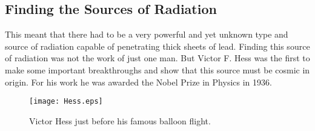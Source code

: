 \subsection{Finding the Sources of Radiation}
This meant that there had to be a very powerful and yet unknown type and source of radiation capable of penetrating thick sheets of lead. Finding this source of radiation was not the work of just one man. But Victor F. Hess was the first to make some important breakthroughs and show that this source must be cosmic in origin. For his work he was awarded the Nobel Prize in Physics in 1936.

\begin{figure}\begin{center}
\texttt{[image: Hess.eps]}
\caption{Victor Hess just before his famous balloon flight.}\label{fig:hess}
\end{center}\end{figure}


